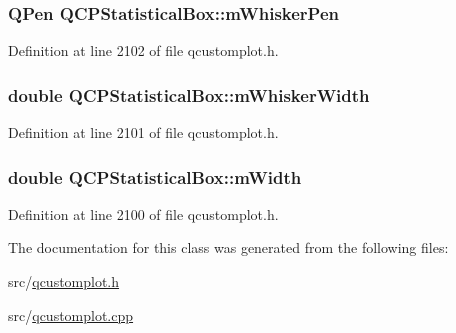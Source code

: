 \hypertarget{class_q_c_p_statistical_box_a25b7552499f0f090fcff02858b2265a5}{
\subsubsection[{m\-Whisker\-Pen}]{\setlength{\rightskip}{0pt plus 5cm}Q\-Pen Q\-C\-P\-Statistical\-Box\-::m\-Whisker\-Pen\hspace{0.3cm}{\ttfamily [protected]}}}\label{class_q_c_p_statistical_box_a25b7552499f0f090fcff02858b2265a5}


Definition at line 2102 of file qcustomplot.\-h.

\hypertarget{class_q_c_p_statistical_box_a4d166474f845d5db626e8b11a0815a6f}{
\subsubsection[{m\-Whisker\-Width}]{\setlength{\rightskip}{0pt plus 5cm}double Q\-C\-P\-Statistical\-Box\-::m\-Whisker\-Width\hspace{0.3cm}{\ttfamily [protected]}}}\label{class_q_c_p_statistical_box_a4d166474f845d5db626e8b11a0815a6f}


Definition at line 2101 of file qcustomplot.\-h.

\hypertarget{class_q_c_p_statistical_box_af365e40b0f706c3d76f857c7957f629d}{
\subsubsection[{m\-Width}]{\setlength{\rightskip}{0pt plus 5cm}double Q\-C\-P\-Statistical\-Box\-::m\-Width\hspace{0.3cm}{\ttfamily [protected]}}}\label{class_q_c_p_statistical_box_af365e40b0f706c3d76f857c7957f629d}


Definition at line 2100 of file qcustomplot.\-h.



The documentation for this class was generated from the following files\-:\begin{DoxyCompactItemize}
\item 
src/\hyperlink{qcustomplot_8h}{qcustomplot.\-h}\item 
src/\hyperlink{qcustomplot_8cpp}{qcustomplot.\-cpp}\end{DoxyCompactItemize}
